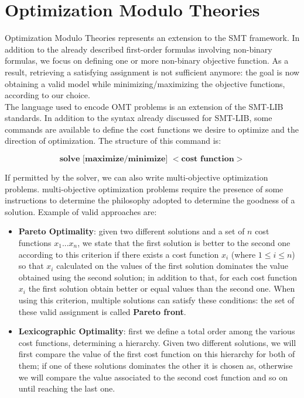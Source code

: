 \section{Optimization Modulo Theories}

Optimization Modulo Theories represents an extension to the SMT framework. In addition to the already described first-order formulas involving non-binary formulas, we focus on defining one or more non-binary objective function. As a result, retrieving a satisfying assignment is not sufficient anymore: the goal is now obtaining a valid model while minimizing/maximizing the objective functions, according to our choice.\\
The language used to encode OMT problems is an extension of the SMT-LIB standards. In addition to the syntax already discussed for SMT-LIB, some commands are available to define the cost functions we desire to optimize and the direction of optimization. The structure of this command is:

\begin{equation*}
    \textbf{solve [maximize/minimize] $<$cost function$>$}
\end{equation*}

If permitted by the solver, we can also write multi-objective optimization problems. multi-objective optimization problems  require the presence of some instructions to determine the philosophy adopted to determine the goodness of a solution. Example of valid approaches are:

\begin{itemize}
    \item \textbf{Pareto Optimality}: given two different solutions and a set of $n$ cost functions $x_1...x_n$, we state that the first solution is better to the second one according to this criterion if there exists a cost function $x_i$ (where $1\leq i\leq n$) so that $x_i$ calculated on the values of the first solution dominates the value obtained using the second solution; in addition to that, for each cost function $x_i$ the first solution obtain better or equal values than the second one. When using this criterion, multiple solutions can satisfy these conditions: the set of these valid assignment is called \textbf{Pareto front}.
    \item \textbf{Lexicographic Optimality}: first we define a total order among the various cost functions, determining  a hierarchy. Given two different solutions, we will first compare the value of the first cost function on this hierarchy for both of them; if one of these solutions dominates the other it is chosen as, otherwise we will compare the value associated to the second cost function and so on until reaching the last one.
\end{itemize}

